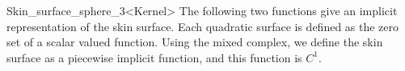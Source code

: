 \begin{ccRefClass}{Skin_surface_sphere_3<Kernel>}
The following two functions give an implicit representation of the
skin surface. Each quadratic surface is defined as the zero set of a
scalar valued function. Using the mixed complex, we define the skin
surface as a piecewise implicit function, and this function is $C^1$.


\ccGlue {}

\ccSeeAlso
{}\\
\end{ccRefClass}

